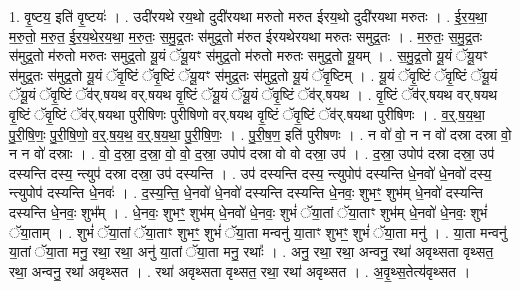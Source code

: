 \documentclass[17pt]{extarticle}
\begin{document}
1. वृ॒ष्टय॒ इति॑ वृ॒ष्टयः॑ । . उदी॑रयथे रय॒थो दुदी॑रयथा मरुतो मरुत ईरय॒थो दुदी॑रयथा मरुतः । . ई॒र॒य॒था॒ म॒रु॒तो॒ म॒रु॒त॒ ई॒र॒य॒थे॒र॒य॒था॒ म॒रु॒तः॒ स॒मु॒द्र॒तः स॑मुद्र॒तो म॑रुत ईरयथेरयथा मरुतः समुद्र॒तः । . म॒रु॒तः॒ स॒मु॒द्र॒तः स॑मुद्र॒तो म॑रुतो मरुतः समुद्र॒तो यू॒यं ॅयू॒यꣳ स॑मुद्र॒तो म॑रुतो मरुतः समुद्र॒तो यू॒यम् । . स॒मु॒द्र॒तो यू॒यं ॅयू॒यꣳ स॑मुद्र॒तः स॑मुद्र॒तो यू॒यं ॅवृ॒ष्टिं ॅवृ॒ष्टिं ॅयू॒यꣳ स॑मुद्र॒तः स॑मुद्र॒तो यू॒यं ॅवृ॒ष्टिम् । . यू॒यं ॅवृ॒ष्टिं ॅवृ॒ष्टिं ॅयू॒यं ॅयू॒यं ॅवृ॒ष्टिं ॅव॑र्.षयथ वर्.षयथ वृ॒ष्टिं ॅयू॒यं ॅयू॒यं ॅवृ॒ष्टिं ॅव॑र्.षयथ । . वृ॒ष्टिं ॅव॑र्.षयथ वर्.षयथ वृ॒ष्टिं ॅवृ॒ष्टिं ॅव॑र्.षयथा पुरीषिणः पुरीषिणो वर्.षयथ वृ॒ष्टिं ॅवृ॒ष्टिं ॅव॑र्.षयथा पुरीषिणः । . व॒र्॒.ष॒य॒था॒ पु॒री॒षि॒णः॒ पु॒री॒षि॒णो॒ व॒र्॒.ष॒य॒थ॒ व॒र्॒.ष॒य॒था॒ पु॒री॒षि॒णः॒ । . पु॒री॒ष॒ण॒ इति॑ पुरीषणः । . न वो॑ वो॒ न न वो॑ दस्रा दस्रा वो॒ न न वो॑ दस्राः । . वो॒ द॒स्रा॒ द॒स्रा॒ वो॒ वो॒ द॒स्रा॒ उपोप॑ दस्रा वो वो दस्रा॒ उप॑ । . द॒स्रा॒ उपोप॑ दस्रा दस्रा॒ उप॑ दस्यन्ति दस्य॒ न्त्युप॑ दस्रा दस्रा॒ उप॑ दस्यन्ति । . उप॑ दस्यन्ति दस्य॒ न्त्युपोप॑ दस्यन्ति धे॒नवो॑ धे॒नवो॑ दस्य॒ न्त्युपोप॑ दस्यन्ति धे॒नवः॑ । . द॒स्य॒न्ति॒ धे॒नवो॑ धे॒नवो॑ दस्यन्ति दस्यन्ति धे॒नवः॒ शुभꣳ॒॒ शुभ॑म् धे॒नवो॑ दस्यन्ति दस्यन्ति धे॒नवः॒ शुभ᳚म् । . धे॒नवः॒ शुभꣳ॒॒ शुभ॑म् धे॒नवो॑ धे॒नवः॒ शुभं॑ ॅया॒तां ॅया॒ताꣳ शुभ॑म् धे॒नवो॑ धे॒नवः॒ शुभं॑ ॅया॒ताम् । . शुभं॑ ॅया॒तां ॅया॒ताꣳ शुभꣳ॒॒ शुभं॑ ॅया॒ता मन्वनु॑ या॒ताꣳ शुभꣳ॒॒ शुभं॑ ॅया॒ता मनु॑ । . या॒ता मन्वनु॑ या॒तां ॅया॒ता मनु॒ रथा॒ रथा॒ अनु॑ या॒तां ॅया॒ता मनु॒ रथाः᳚ । . अनु॒ रथा॒ रथा॒ अन्वनु॒ रथा॑ अवृथ्सता वृथ्सत॒ रथा॒ अन्वनु॒ रथा॑ अवृथ्सत । . रथा॑ अवृथ्सता वृथ्सत॒ रथा॒ रथा॑ अवृथ्सत । . अ॒वृ॒थ्स॒तेत्य॑वृथ्सत । \newline
\end{document}
